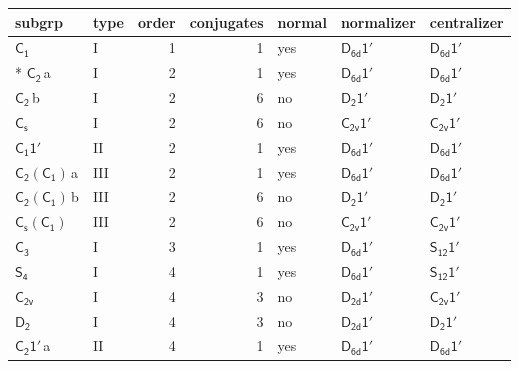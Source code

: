 \documentclass[10pt,a4paper]{article}
\numberwithin{equation}{section}
\newcommand{\grp}[1]{\mathsf{#1}}
\newcommand{\clsletter}[1]{\,{\scriptsize\color{black!55}#1}}
\begin{document}
{\small\begin{longtable}{@{}llrrlll@{}}\toprule
subgrp & type & order & conjugates & normal & normalizer & centralizer\\\midrule\endhead
\bottomrule\endfoot\endlastfoot
\href{../../../rotation/data/pdf/C1.pdf}{$\grp{C_{1}}$} & I & 1 & 1 & yes & \href{D6d-1p.pdf}{$\grp{D_{6d}1'}$} & \href{D6d-1p.pdf}{$\grp{D_{6d}1'}$}\\*
\href{../../../rotation/data/pdf/C2.pdf}{$\grp{C_{2}}$}\clsletter{a} & I & 2 & 1 & yes & \href{D6d-1p.pdf}{$\grp{D_{6d}1'}$} & \href{D6d-1p.pdf}{$\grp{D_{6d}1'}$}\\
\href{../../../rotation/data/pdf/C2.pdf}{$\grp{C_{2}}$}\clsletter{b} & I & 2 & 6 & no & \href{D2-1p.pdf}{$\grp{D_{2}1'}$} & \href{D2-1p.pdf}{$\grp{D_{2}1'}$}\\
\href{../../../rotation/data/pdf/C1v.pdf}{$\grp{C_{s}}$} & I & 2 & 6 & no & \href{C2v-1p.pdf}{$\grp{C_{2v}1'}$} & \href{C2v-1p.pdf}{$\grp{C_{2v}1'}$}\\
\href{C1-1p.pdf}{$\grp{C_{1}1'}$} & II & 2 & 1 & yes & \href{D6d-1p.pdf}{$\grp{D_{6d}1'}$} & \href{D6d-1p.pdf}{$\grp{D_{6d}1'}$}\\
\href{C2-C1.pdf}{$\grp{C_{2}}(\grp{C_{1}})$}\clsletter{a} & III & 2 & 1 & yes & \href{D6d-1p.pdf}{$\grp{D_{6d}1'}$} & \href{D6d-1p.pdf}{$\grp{D_{6d}1'}$}\\
\href{C2-C1.pdf}{$\grp{C_{2}}(\grp{C_{1}})$}\clsletter{b} & III & 2 & 6 & no & \href{D2-1p.pdf}{$\grp{D_{2}1'}$} & \href{D2-1p.pdf}{$\grp{D_{2}1'}$}\\
\href{C1v-C1.pdf}{$\grp{C_{s}}(\grp{C_{1}})$} & III & 2 & 6 & no & \href{C2v-1p.pdf}{$\grp{C_{2v}1'}$} & \href{C2v-1p.pdf}{$\grp{C_{2v}1'}$}\\
\href{../../../rotation/data/pdf/C3.pdf}{$\grp{C_{3}}$} & I & 3 & 1 & yes & \href{D6d-1p.pdf}{$\grp{D_{6d}1'}$} & \href{S12-1p.pdf}{$\grp{S_{12}1'}$}\\
\href{../../../rotation/data/pdf/S4.pdf}{$\grp{S_{4}}$} & I & 4 & 1 & yes & \href{D6d-1p.pdf}{$\grp{D_{6d}1'}$} & \href{S12-1p.pdf}{$\grp{S_{12}1'}$}\\
\href{../../../rotation/data/pdf/C2v.pdf}{$\grp{C_{2v}}$} & I & 4 & 3 & no & \href{D2d-1p.pdf}{$\grp{D_{2d}1'}$} & \href{C2v-1p.pdf}{$\grp{C_{2v}1'}$}\\
\href{../../../rotation/data/pdf/D2.pdf}{$\grp{D_{2}}$} & I & 4 & 3 & no & \href{D2d-1p.pdf}{$\grp{D_{2d}1'}$} & \href{D2-1p.pdf}{$\grp{D_{2}1'}$}\\
\href{C2-1p.pdf}{$\grp{C_{2}1'}$}\clsletter{a} & II & 4 & 1 & yes & \href{D6d-1p.pdf}{$\grp{D_{6d}1'}$} & \href{D6d-1p.pdf}{$\grp{D_{6d}1'}$}\\

\end{longtable}}
\end{document}
